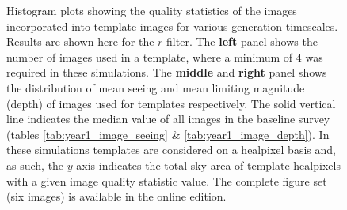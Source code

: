 \documentclass[preprintm,linenumbers]{aastex631}
\begin{document}
\begin{figure}
\begin{tabular}{c c c}
			\end{tabular}
			\caption{
				Histogram plots showing the quality statistics of the images incorporated into template images for various generation timescales.
				Results are shown here for the $r$ filter.
				The \textbf{left} panel shows the number of images used in a template, where a minimum of 4 was required in these simulations. %
				The \textbf{middle} and \textbf{right} panel shows the distribution of mean seeing and mean limiting magnitude (depth) of images used for templates respectively.
				The solid vertical line indicates the median value of all images in the baseline survey (tables \ref{tab:year1_image_seeing} \& \ref{tab:year1_image_depth}).
				In these simulations templates are considered on a healpixel basis and, as such, the $y$-axis indicates the total sky area of template healpixels with a given image quality statistic value. The complete figure set (six images) is available in the online edition.
			}
			\label{fig:template_image_histograms_tscale}
		\end{figure}
		
\end{document}
